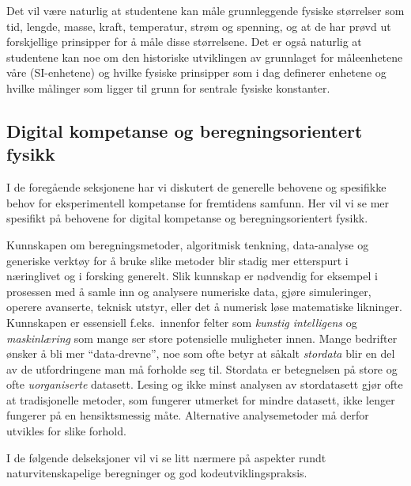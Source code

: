 \documentclass{article}
\begin{document}
Det vil være naturlig at studentene kan måle grunnleggende fysiske størrelser som tid, lengde, masse, kraft, temperatur, strøm og spenning, og at de har prøvd ut forskjellige prinsipper for å måle disse størrelsene. Det er også naturlig at studentene kan noe om den historiske utviklingen av grunnlaget for måleenhetene våre (SI-enhetene) og hvilke fysiske prinsipper som i dag definerer enhetene og hvilke målinger som ligger til grunn for sentrale fysiske konstanter.


\subsection{Digital kompetanse og beregningsorientert fysikk}
\label{sec:behov-dig}
I de foregående seksjonene har vi diskutert de generelle behovene og spesifikke behov for eksperimentell kompetanse for fremtidens samfunn. Her vil vi se mer spesifikt på behovene for digital kompetanse og beregningsorientert fysikk.


Kunnskapen om beregningsmetoder, algoritmisk tenkning, data-analyse og generiske verktøy for å bruke slike metoder blir stadig mer etterspurt i næringlivet og i forsking generelt.
Slik kunnskap er nødvendig for eksempel i prosessen med å samle inn og analysere numeriske data, gjøre simuleringer, operere avanserte, teknisk utstyr, eller det å numerisk løse matematiske likninger.
Kunnskapen er essensiell f.eks.~innenfor felter som \emph{kunstig intelligens} og \emph{maskinlæring} som mange ser store potensielle muligheter innen.
Mange bedrifter ønsker å bli mer ``data-drevne'', noe som ofte betyr at såkalt \emph{stordata} blir en del av de utfordringene man må forholde seg til.
Stordata er betegnelsen på store og ofte \emph{uorganiserte} datasett.
Lesing og ikke minst analysen av stordatasett gjør ofte at tradisjonelle metoder, som fungerer utmerket for mindre datasett, ikke lenger fungerer på en hensiktsmessig måte.
Alternative analysemetoder må derfor utvikles for slike forhold.

I de følgende delseksjoner vil vi se litt nærmere på aspekter rundt naturvitenskapelige beregninger og god kodeutviklingspraksis.
\end{document}
